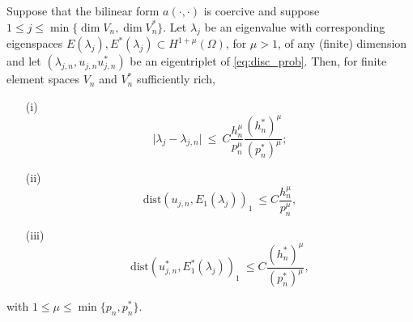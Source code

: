 \documentclass[smallextended]{svjour3}
\begin{document}
\begin{lemma}
\label{lm:adj}
Suppose  that the bilinear form $a(\cdot,\cdot)$ is coercive and suppose
$ 1 \leq j\leq \min\{\dim V_n,\dim V_n^*\}$. Let
$\lambda_j$ be an eigenvalue with
corresponding eigenspaces $E(\lambda_j),E^*(\lambda_j)\subset H^{1+\mu}(\Omega)$, for $\mu>1$, of any (finite) dimension  and
let $(\lambda_{j,n},u_{j,n}u_{j,n}^*)$ be an  eigentriplet  of \eqref{eq:disc_prob}.
Then, for finite element spaces $V_n$ and $V_n^*$ sufficiently rich,
\begin{itemize}
\item[(i)] 
\begin{equation}\label{eq:supereig}
\vert \lambda_j - \lambda_{j,n} \vert \ \leq \ C
\frac{h_n^{\mu} }{p_n^{\mu}}\frac{(h_n^*)^{\mu} }{(p_n^*)^{\mu}};  
\end{equation}
\item[(ii)] 
\begin{equation}
\label{eq:energy} \mathrm{dist}(
u_{j,n},E_1(\lambda_j))_{1} \ \leq
C \frac{h_n^{\mu}}{p_n^{\mu}}, 
\end{equation}
\item[(iii)]
\begin{equation}
\label{eq:energy_dual} \mathrm{dist}(
u_{j,n}^*,E_1^*(\lambda_j))_{1} \ \leq
C \frac{(h_n^*)^{\mu}}{(p_n^*)^{\mu}}, 
\end{equation}
\end{itemize}
with $1\leq \mu\leq \min\{p_n,p_n^*\}$.
\end{lemma}
\end{document}
